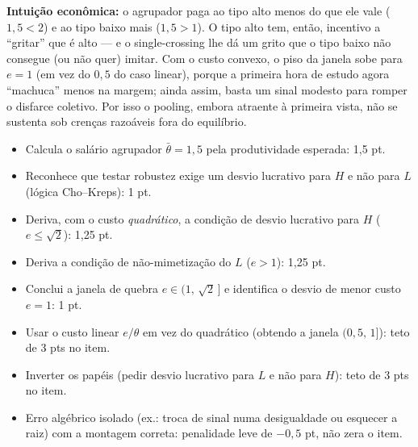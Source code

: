 \begin{solucao}
\textbf{Intui\c{c}\~ao econ\^omica:} o agrupador paga ao tipo alto menos do que ele vale ($1{,}5<2$) e ao tipo baixo mais ($1{,}5>1$). O tipo alto tem, ent\~ao, incentivo a ``gritar'' que \'e alto --- e o single-crossing lhe d\'a um grito que o tipo baixo n\~ao consegue (ou n\~ao quer) imitar. Com o custo convexo, o piso da janela sobe para $e=1$ (em vez do $0{,}5$ do caso linear), porque a primeira hora de estudo agora ``machuca'' menos na margem; ainda assim, basta um sinal modesto para romper o disfarce coletivo. Por isso o pooling, embora atraente \`a primeira vista, n\~ao se sustenta sob cren\c{c}as razo\'aveis fora do equil\'ibrio.
\rubricalabel
\begin{itemize}
\item Calcula o sal\'ario agrupador $\bar\theta=1{,}5$ pela produtividade esperada: 1{,}5 pt.
\item Reconhece que testar robustez exige um desvio lucrativo para $H$ e n\~ao para $L$ (l\'ogica Cho--Kreps): 1 pt.
\item Deriva, com o custo \emph{quadr\'atico}, a condi\c{c}\~ao de desvio lucrativo para $H$ ($e\le\sqrt{2}$): 1{,}25 pt.
\item Deriva a condi\c{c}\~ao de n\~ao-mimetiza\c{c}\~ao do $L$ ($e>1$): 1{,}25 pt.
\item Conclui a janela de quebra $e\in(1,\,\sqrt{2}\,]$ e identifica o desvio de menor custo $e=1$: 1 pt.
\item Usar o custo linear $e/\theta$ em vez do quadr\'atico (obtendo a janela $(0{,}5,\,1]$): teto de 3 pts no item.
\item Inverter os pap\'eis (pedir desvio lucrativo para $L$ e n\~ao para $H$): teto de 3 pts no item.
\item Erro alg\'ebrico isolado (ex.: troca de sinal numa desigualdade ou esquecer a raiz) com a montagem correta: penalidade leve de $-0{,}5$ pt, n\~ao zera o item.
\end{itemize}
\end{solucao}

